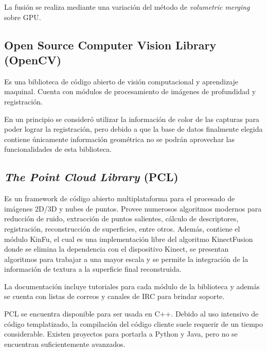 	La fusión se realiza mediante una variación del método de
	\emph{volumetric merging} sobre GPU\cite{Izadi:2011:KRR:2047196.2047270}.





	\subsection{Open Source Computer Vision Library (OpenCV)}
	Es una biblioteca de código abierto de visión computacional y aprendizaje
	maquinal.  Cuenta con módulos de procesamiento de imágenes de profundidad y
	registración.

	En un principio se consideró utilizar la información de color de las capturas
	para poder lograr la registración, pero debido a que la base de datos
	finalmente elegida contiene únicamente información geométrica
	no se podrán aprovechar las funcionalidades de esta biblioteca.

	\subsection{\emph{The Point Cloud Library} (PCL)}
	Es un framework de código abierto multiplataforma para el procesado de
	imágenes 2D/3D y nubes de puntos.
	Provee numerosos algoritmos modernos para reducción de ruido, extracción de
	puntos salientes, cálculo de descriptores, registración, reconstrucción de
	superficies, entre otros\cite{5980567}.
	Además, contiene el módulo KinFu, el cual es una implementación libre del algoritmo KinectFusion
	donde se elimina la dependencia con el dispositivo Kinect,
	se presentan algoritmos para trabajar a una mayor escala
	y se permite la integración de la información de textura a la superficie final reconstruida\cite{real-time-3d-reconstruction-using-a-kinect-sensor}.

	La documentación incluye tutoriales para cada módulo de la biblioteca y
	además se cuenta con listas de correos y canales de IRC para brindar
	soporte.

	PCL se encuentra disponible para ser usada en C++.
	Debido al uso intensivo de código templatizado, la compilación del
	código cliente suele requerir de un tiempo considerable.
	Existen proyectos para portarla a Python y Java, pero no se encuentran
	suficientemente avanzados.

